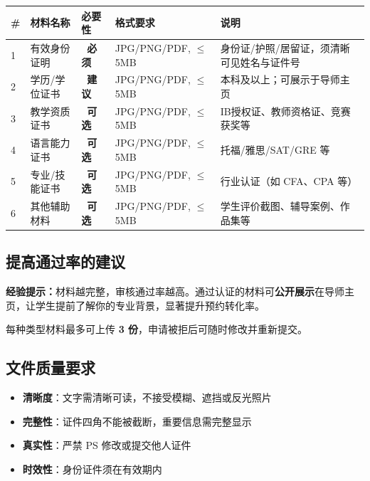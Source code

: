 \documentclass[a4paper,10pt]{article}
\newcommand{\req}{\colorbox{RedLt}{\color{RedErr}\tiny\textbf{\ 必须\ }}}
\newcommand{\opt}{\colorbox{BrandBlueLt}{\color{BrandBlue}\tiny\textbf{\ 建议\ }}}
\newcommand{\optc}{\colorbox{GrayLight}{\color{GrayMid}\tiny\textbf{\ 可选\ }}}
\begin{document}
\renewcommand{\arraystretch}{1.5}
\begin{tabularx}{\textwidth}{
  C{0.5cm}
  L{3cm}
  C{1.6cm}
  C{2.6cm}
  X
}
\toprule
\textbf{\#} & \textbf{材料名称} & \textbf{必要性} & \textbf{格式要求} & \textbf{说明} \\
\midrule
{}
1 & 有效身份证明 & \req & JPG/PNG/PDF, $\leq$5MB & 身份证/护照/居留证，须清晰可见姓名与证件号 \\
2 & 学历/学位证书 & \opt & JPG/PNG/PDF, $\leq$5MB & 本科及以上；可展示于导师主页 \\
3 & 教学资质证书 & \optc & JPG/PNG/PDF, $\leq$5MB & IB授权证、教师资格证、竞赛获奖等 \\
4 & 语言能力证书 & \optc & JPG/PNG/PDF, $\leq$5MB & 托福/雅思/SAT/GRE 等 \\
5 & 专业/技能证书 & \optc & JPG/PNG/PDF, $\leq$5MB & 行业认证（如 CFA、CPA 等） \\
6 & 其他辅助材料 & \optc & JPG/PNG/PDF, $\leq$5MB & 学生评价截图、辅导案例、作品集等 \\
\bottomrule
\end{tabularx}

\subsection{提高通过率的建议}

\begin{goldbox}
\textbf{经验提示：}材料越完整，审核通过率越高。通过认证的材料可\textbf{公开展示}在导师主页，让学生提前了解你的专业背景，显著提升预约转化率。

每种类型材料最多可上传 \textbf{3 份}，申请被拒后可随时修改并重新提交。
\end{goldbox}

\subsection{文件质量要求}

\begin{itemize}
  \item \textbf{清晰度}：文字需清晰可读，不接受模糊、遮挡或反光照片
  \item \textbf{完整性}：证件四角不能被截断，重要信息需完整显示
  \item \textbf{真实性}：严禁 PS 修改或提交他人证件
  \item \textbf{时效性}：身份证件须在有效期内
\end{itemize}
\end{document}
